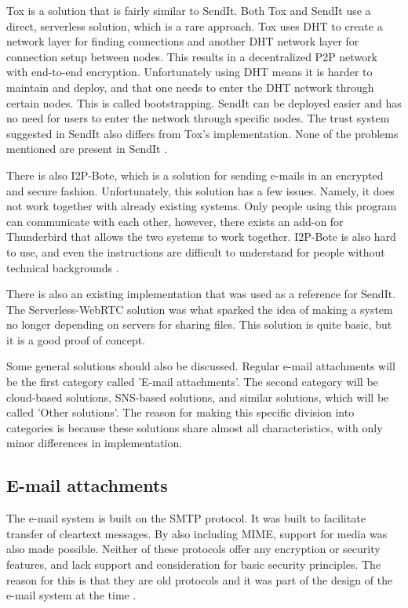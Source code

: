 Tox is a solution that is fairly similar to SendIt. Both Tox and SendIt use a direct, serverless solution, which is a rare approach. Tox uses DHT to create a network layer for finding connections and another DHT network layer for connection setup between nodes. This results in a decentralized P2P network with end-to-end encryption. Unfortunately using DHT means it is harder to maintain and deploy, and that one needs to enter the DHT network through certain nodes. This is called bootstrapping. SendIt can be deployed easier and has no need for users to enter the network through specific nodes. The trust system suggested in SendIt also differs from Tox's implementation. None of the problems mentioned are present in SendIt \cite{url_tox,url_toxdoc}.

There is also I2P-Bote, which is a solution for sending e-mails in an encrypted and secure fashion. Unfortunately, this solution has a few issues. Namely, it does not work together with already existing systems. Only people using this program can communicate with each other, however, there exists an add-on for Thunderbird that allows the two systems to work together. I2P-Bote is also hard to use, and even the instructions are difficult to understand for people without technical backgrounds \cite{url_I2PBote,url_I2PInfo}.

There is also an existing implementation that was used as a reference for SendIt. The Serverless-WebRTC solution \cite{url_webrtc_ex} was what sparked the idea of making a system no longer depending on servers for sharing files. This solution is quite basic, but it is a good proof of concept.

Some general solutions should also be discussed. Regular e-mail attachments will be the first category called 'E-mail attachments'. The second category will be cloud-based solutions, SNS-based solutions, and similar solutions, which will be called 'Other solutions'. The reason for making this specific division into categories is because these solutions share almost all characteristics, with only minor differences in implementation. 
%
%
\subsection{E-mail attachments}
\label{sec:intro_email}
%
The e-mail system is built on the SMTP protocol. It was built to facilitate transfer of cleartext messages. By also including MIME, support for media was also made possible. Neither of these protocols offer any encryption or security features, and lack support and consideration for basic security principles. The reason for this is that they are old protocols and it was part of the design of the e-mail system at the time \cite{partridgeTechnicalDevelopmentInternet2008}.

